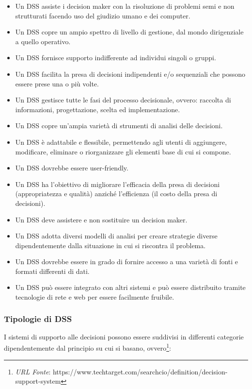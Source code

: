 \begin{itemize}
    \item Un DSS assiste i decision maker con la risoluzione di problemi semi e non strutturati facendo uso del giudizio umano e dei computer.
    \item Un DSS copre un ampio spettro di livello di gestione, dal mondo dirigenziale a quello operativo.
    \item Un DSS fornisce supporto indifferente ad individui singoli o gruppi.
    \item Un DSS facilita la presa di decisioni indipendenti e/o sequenziali che possono essere prese una o più volte.
    \item Un DSS gestisce tutte le fasi del processo decisionale, ovvero: raccolta di informazioni, progettazione, scelta ed implementazione.
    \item Un DSS copre un'ampia varietà di strumenti di analisi delle decisioni.
    \item Un DSS è adattabile e flessibile, permettendo agli utenti di aggiungere, modificare, eliminare o riorganizzare gli elementi base di cui si compone.
    \item Un DSS dovrebbe essere user-friendly.
    \item Un DSS ha l'obiettivo di migliorare l'efficacia della presa di decisioni (appropriatezza e qualità) anziché l'efficienza (il costo della presa di decisioni).
    \item Un DSS deve assistere e non sostituire un decision maker.
    \item Un DSS adotta diversi modelli di analisi per creare strategie diverse dipendentemente dalla situazione in cui si riscontra il problema.
    \item Un DSS dovrebbe essere in grado di fornire accesso a una varietà di fonti e formati differenti di dati.
    \item Un DSS può essere integrato con altri sistemi e può essere distribuito tramite tecnologie di rete e web per essere facilmente fruibile.
\end{itemize}

\subsubsection{Tipologie di DSS}

I sistemi di supporto alle decisioni possono essere suddivisi in differenti categorie dipendentemente dal principio su cui si basano, ovvero\footnote{\textit{URL Fonte}: https://www.techtarget.com/searchcio/definition/decision-support-system}:

